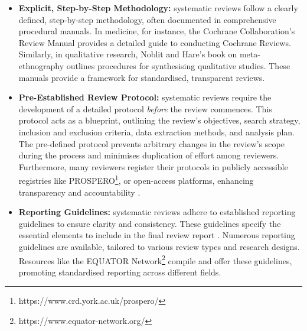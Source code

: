 \documentclass{article}
\begin{document}
\begin{itemize}
    \item {\bf{Explicit, Step-by-Step Methodology:}} systematic reviews follow a clearly defined, step-by-step methodology, often documented in comprehensive procedural manuals. In medicine, for instance, the Cochrane Collaboration's Review Manual \cite{lefebvre_cochrane_2011} provides a detailed guide to conducting Cochrane Reviews. Similarly, in qualitative research, Noblit and Hare's book on meta-ethnography \cite{noblit_meta-ethnography_1988} outlines procedures for synthesising qualitative studies. These manuals provide a framework for standardised, transparent reviews.
    \item {\bf{Pre-Established Review Protocol:}} systematic reviews require the development of a detailed protocol {\it{before}} the review commences. This protocol acts as a blueprint, outlining the review's objectives, search strategy, inclusion and exclusion criteria, data extraction methods, and analysis plan. The pre-defined protocol prevents arbitrary changes in the review's scope during the process and minimises duplication of effort among reviewers. Furthermore, many reviewers register their protocols in publicly accessible registries like PROSPERO\footnote{https://www.crd.york.ac.uk/prospero/}, or open-access platforms, enhancing transparency and accountability \cite{tawfik_protocol_2020}.
    \item {\bf{Reporting Guidelines:}} systematic reviews adhere to established reporting guidelines to ensure clarity and consistency. These guidelines specify the essential elements to include in the final review report \cite{moher_preferred_2010}. Numerous reporting guidelines are available, tailored to various review types and research designs. Resources like the EQUATOR Network\footnote{https://www.equator-network.org/} compile and offer these guidelines, promoting standardised reporting across different fields.
    

\end{itemize}
\end{document}
